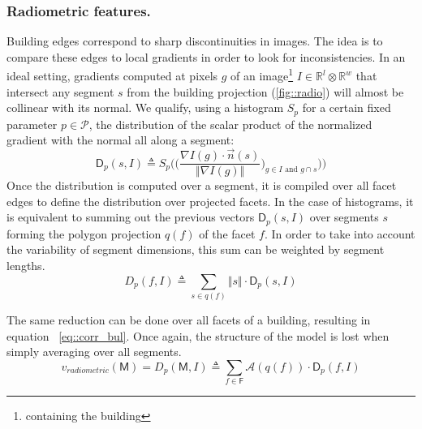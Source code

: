 \documentclass[runningheads]{llncs}
\begin{document}
\subsubsection{Radiometric features.}
Building edges correspond to sharp discontinuities in images. The idea is to compare these edges to local gradients in order to look for inconsistencies. In an ideal setting, gradients computed at pixels $g$ of an image\footnote{containing the building} $I \in \mathbb{R}^l \otimes \mathbb{R}^w$ that intersect any segment $s$ from the building projection (\ref{fig::radio}) will almost be collinear with its normal. We qualify, using a histogram $S_p$ for a certain fixed parameter $p \in \mathscr{P}$, the distribution of the scalar product of the normalized gradient with the normal all along a segment:
\begin{equation}
	\label{eq::corr_seg}
    \mathsf{D}_p(s, I) \triangleq S_p \bigg( \Big(\frac{\nabla I(g) \cdot \vec{n}(s)}{\Vert \nabla I(g)\Vert})_{g \in I \textrm{ and } g \cap s} \Big)\bigg)
\end{equation}
Once the distribution is computed over a segment, it is compiled over all facet edges to define the distribution over projected facets. In the case of histograms, it is equivalent to summing out the previous vectors $\mathsf{D}_p(s, I)$ over segments $s$ forming the polygon projection $q(f)$ of the facet $f$. In order to take into account the variability of segment dimensions, this sum can be weighted by segment lengths.
\begin{equation}
	\label{eq::corr_fac}
	D_p(f, I) \triangleq \sum_{s \in q(f)} \Vert s \Vert \cdot \mathsf{D}_p(s, I)
\end{equation}

The same reduction can be done over all facets of a building, resulting in equation ~\ref{eq::corr_bul}. Once again, the structure of the model is lost when simply averaging over all segments.
\begin{equation}
	\label{eq::corr_bul}
	v_{radiometric}(\mathsf{M}) = D_p(\mathsf{M}, I) \triangleq \sum_{f \in \mathsf{F}} \mathscr{A}(q(f)) \cdot \mathsf{D}_p(f, I)
\end{equation}
\end{document}
